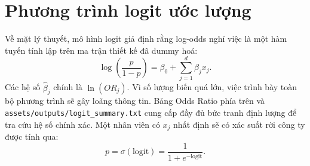 \section{Phương trình logit ước lượng}
Về mặt lý thuyết, mô hình logit giả định rằng log-odds nghỉ việc là một hàm tuyến tính lập trên ma trận thiết kế đã dummy hoá:
\[
\log\left(\frac{p}{1-p}\right) = \beta_0 + \sum_{j=1}^{d}\beta_j x_j.
\]
Các hệ số $\hat{\beta}_j$ chính là $\ln(OR_j)$. Vì số lượng biến quá lớn, việc trình bày toàn bộ phương trình sẽ gây loãng thông tin. Bảng Odds Ratio phía trên và \texttt{assets/outputs/logit\_summary.txt} cung cấp đầy đủ bức tranh định lượng để tra cứu hệ số chính xác. Một nhân viên có $x_j$ nhất định sẽ có xác suất rời công ty được tính qua:
\[
p = \sigma(\text{logit}) = \frac{1}{1 + e^{-\text{logit}}}.
\]
